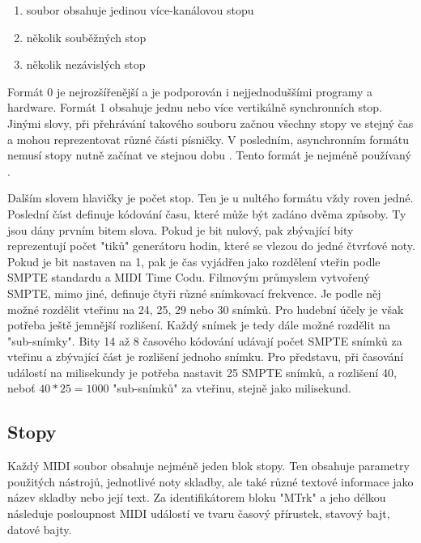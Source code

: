 \begin{enumerate}\addtocounter{enumi}{-1}
    \item soubor obsahuje jedinou více-kanálovou stopu
    \item několik souběžných stop
    \item několik nezávislých stop
\end{enumerate}

Formát 0 je nejrozšířenější a je podporován i nejjednoduššími programy a hardware.
\cite{Back_SMF_Specif}
Formát 1 obsahuje jednu nebo více vertikálně synchronních stop.
Jinými slovy, při přehrávání takového souboru začnou všechny stopy ve stejný čas 
a mohou reprezentovat různé části písničky.
V posledním, asynchronním formátu nemusí stopy nutně začínat ve stejnou dobu
\cite{Neznamy_aboutMIDIFiles}.
Tento formát je nejméně používaný
\cite{MIDI_tutorials}.
\par

Dalším slovem hlavičky je počet stop.
Ten je u nultého formátu vždy roven jedné.
Poslední část definuje kódování času, 
které může být zadáno dvěma způsoby.
Ty jsou dány prvním bitem slova.
Pokud je bit nulový, pak zbývající bity reprezentují počet "tiků" generátoru hodin, 
které se vlezou do jedné čtvrťové noty.
Pokud je bit nastaven na 1, pak je čas vyjádřen jako rozdělení vteřin podle SMPTE standardu
a MIDI Time Codu.
\cite{Back_SMF_Specif}
Filmovým průmyslem vytvořený SMPTE, mimo jiné, definuje čtyři různé snímkovací frekvence.
Je podle něj možné rozdělit vteřinu na 24, 25, 29 nebo 30 snímků.
Pro hudební účely je však potřeba ještě jemnější rozlišení.
Každý snímek je tedy dále možné rozdělit na "sub-snímky".
\cite{Neznamy_aboutMIDIFiles}
Bity 14 až 8 časového kódování udávají počet SMPTE snímků za vteřinu 
a zbývající část je rozlišení jednoho snímku.
Pro představu, při časování událostí na milisekundy je potřeba nastavit 25 SMPTE snímků,
a rozlišení 40, neboť $ 40 * 25 = 1000 $ "sub-snímků" za vteřinu, stejně jako milisekund. 
\cite{Back_SMF_Specif}
\par

\subsection{Stopy}
Každý MIDI soubor obsahuje nejméně jeden blok stopy.
Ten obsahuje parametry použitých nástrojů, jednotlivé noty skladby, 
ale také různé textové informace jako název skladby nebo její text.
Za identifikátorem bloku "MTrk" a jeho délkou následuje posloupnost MIDI událostí
ve tvaru časový přírustek, stavový bajt, datové bajty.
\cite{Back_SMF_Specif}
\par

